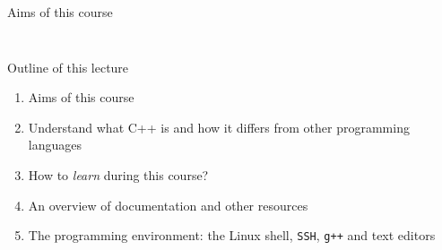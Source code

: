 \documentclass{beamer}
\begin{document}
\begin{frame}{Aims of this course}
\begin{columns}
\begin{column}{0.5\textwidth}
\begin{figure}
            \end{figure}
        \end{column}
    \end{columns}
\end{frame}
\begin{frame}{Outline of this lecture}
    \begin{enumerate}
        \item Aims of this course \checkmark
            \pause
        \item Understand what C++ is and how it differs from other programming languages 
            \pause
        \item How to \emph{learn} during this course?
            \pause
        \item An overview of documentation and other resources
            \pause
        \item The programming environment: the Linux shell, \texttt{SSH}, \texttt{g++} and text editors
    \end{enumerate}
\end{frame}
\end{document}
